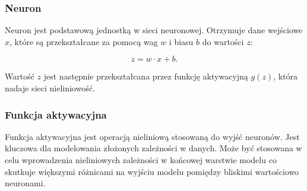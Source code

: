 \begin{table}[!ht]
	\centering
	\caption{Rodzaje warstw w sieciach neuronowych}
	\label{tab:layer_types}
	\begin{center}
	\end{center}
\end{table}

\subsubsection{Neuron}

Neuron jest podstawową jednostką w sieci neuronowej. Otrzymuje dane wejściowe \(x\), które są przekształcane za pomocą wag \(w\) i biasu \(b\) do wartości \(z\):

\[
	z = w \cdot x + b.
\]

Wartość \(z\) jest następnie przekształcana przez funkcję aktywacyjną \(g(z)\), która nadaje sieci nieliniowość.

\subsubsection{Funkcja aktywacyjna}

Funkcja aktywacyjna jest operacją nieliniową stosowaną do wyjść neuronów. Jest kluczowa dla modelowania złożonych zależności w danych.
Może być stosowana w celu wprowadzenia nieliniowych zależności w końcowej warstwie modelu co skutkuje większymi różnicami na wyjściu modelu pomiędzy bliskimi wartościowo neuronami.

